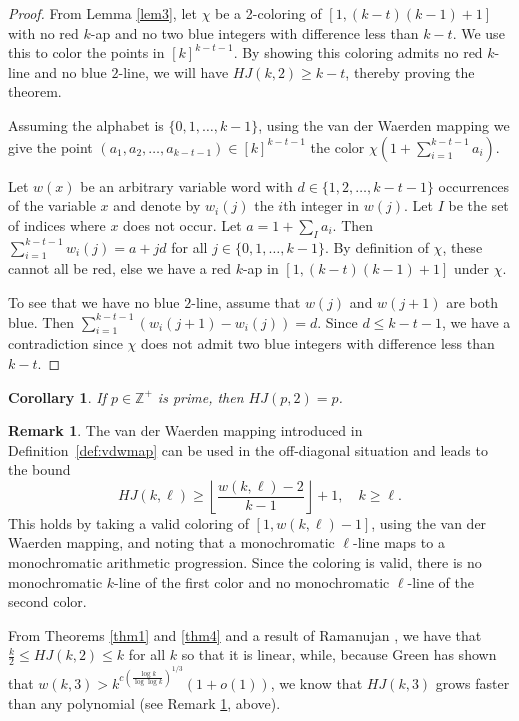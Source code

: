 \documentclass[11pt]{article}
\newtheorem{cor}[thm]{Corollary}
\theoremstyle{definition}
\newtheorem{rem}[thm]{Remark}
\begin{document}
\begin{proof} From Lemma \ref{lem3}, let $\chi$ be a 2-coloring of $[1,(k-t)(k-1)+1]$ with no red $k$-ap
and no two blue integers with difference less than $k-t$.  We use this to color the points in $[k]^{k-t-1}$.
By showing this coloring admits no red $k$-line and no blue $2$-line, we will have $HJ(k,2) \geq k-t$, thereby
proving the theorem.

Assuming the alphabet is $\{0,1,\dots,k-1\}$, using the van der Waerden mapping we give the point
$(a_1,a_2,\dots,a_{k-t-1}) \in [k]^{k-t-1}$ the color $\chi\left(1+\sum_{i=1}^{k-t-1} a_i\right)$.
 

Let $w(x)$ be an arbitrary variable word with $d \in \{1,2,\dots,k-t-1\}$ occurrences of the variable $x$ and
denote by $w_i(j)$ the $i$th integer in $w(j)$.
Let $I$ be the set of indices where $x$ does not occur.  Let $a=1+\sum_{I} a_i$.  Then
$\sum_{i=1}^{k-t-1} w_i(j) = a+jd$ for all $j \in \{0,1,\dots,k-1\}$.  By definition of $\chi$, these cannot all be
red, else we have a red $k$-ap in $[1,(k-t)(k-1)+1]$ under $\chi$.

To see that we have no blue $2$-line, assume that $w(j)$ and $w(j+1)$ are both blue.
Then $\sum_{i=1}^{k-t-1} (w_i(j+1)-w_i(j)) = d$.  Since $d \leq k-t-1$, we have a contradiction since
$\chi$ does not admit two blue integers with difference less than $k-t$.
\end{proof}


\begin{cor} If $p \in \mathbb{Z}^+$ is prime, then $HJ(p,2)=p$.
\end{cor}

\begin{rem}\label{rem16} The van der Waerden mapping introduced in Definition~\ref{def:vdwmap} can be used in the off-diagonal situation and leads to the bound
$$
HJ(k,\ell) \geq \left\lfloor\frac{w(k,\ell)-2}{k-1}\right\rfloor+1, \quad k \geq \ell.
$$
This holds by taking a valid coloring of $[1,w(k,\ell)-1]$, using the van der Waerden mapping, and noting that
a monochromatic $\ell$-line maps to a monochromatic arithmetic progression.  Since
the coloring is valid, there is no monochromatic $k$-line of the first color and
no monochromatic $\ell$-line of the second color.
\end{rem}

 From Theorems \ref{thm1} and \ref{thm4} and a result of Ramanujan
\cite{Ram}, we have that $\frac{k}{2} \leq HJ(k,2) \leq k$ for all $k$ so that it is   linear, while, because
Green \cite{Gre} has shown that $w(k,3) > k^{c \left(\frac{\log k}{\log \log k}\right)^{1/3}}(1+o(1))$, we know that $HJ(k,3)$ grows faster
than any polynomial (see   Remark \ref{rem16}, above).
 
\end{document}
